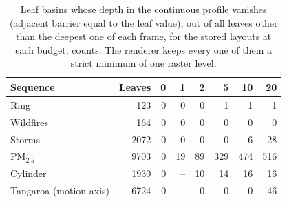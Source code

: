 \begin{table}[!htb]
\centering
\caption{Leaf basins whose depth in the continuous profile vanishes (adjacent barrier equal to the leaf value), out of all leaves other than the deepest one of each frame, for the stored layouts at each budget; counts. The renderer keeps every one of them a strict minimum of one raster level.}
\label{tab:depth}
\footnotesize
\setlength{\tabcolsep}{3pt}
\begin{tabular}{@{}lrrrrrrr@{}}
\toprule
Sequence & Leaves & 0 & 1 & 2 & 5 & 10 & 20 \\
\midrule
Ring & 123 & 0 & 0 & 0 & 1 & 1 & 1 \\
Wildfires & 164 & 0 & 0 & 0 & 0 & 0 & 0 \\
Storms & 2072 & 0 & 0 & 0 & 0 & 6 & 28 \\
PM$_{2.5}$ & 9703 & 0 & 19 & 89 & 329 & 474 & 516 \\
Cylinder & 1930 & 0 & -- & 10 & 14 & 16 & 16 \\
Tangaroa (motion axis) & 6724 & 0 & -- & 0 & 0 & 0 & 46 \\
\bottomrule
\end{tabular}
\end{table}
